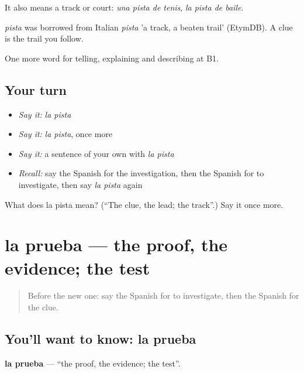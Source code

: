It also means a track or court: \emph{una pista de tenis}, \emph{la pista de baile}.

\begin{cousinweb}
\emph{pista} was borrowed from Italian \emph{pista} 'a track, a beaten trail' (EtymDB). A clue is the trail you follow.
\end{cousinweb}

\begin{grammarlens}[title={What you've built}]
One more word for telling, explaining and describing at B1.
\end{grammarlens}

\subsection*{Your turn}
\begin{itemize}
\raggedright
  \item \emph{Say it:} \emph{la pista}
  \item \emph{Say it:} \emph{la pista}, once more
  \item \emph{Say it:} a sentence of your own with \emph{la pista}
  \item \emph{Recall:} say the Spanish for the investigation, then the Spanish for to investigate, then say \emph{la pista} again
\end{itemize}

\begin{tcolorbox}[breakable,colback=teal!4,colframe=teal!35!black,title={Before you move on}]
What does la pista mean? (\textquotedblleft{}The clue, the lead; the track\textquotedblright{}.) Say it once more.
\end{tcolorbox}
\section[la prueba]{la prueba — the proof, the evidence; the test}

\label{lesson:ES-C521-prueba}



\begin{quote}
Before the new one: say the Spanish for to investigate, then the Spanish for the clue.
\end{quote}

\subsection*{You'll want to know: la prueba}
\textbf{la prueba} — \textquotedblleft{}the proof, the evidence; the test\textquotedblright{}.

